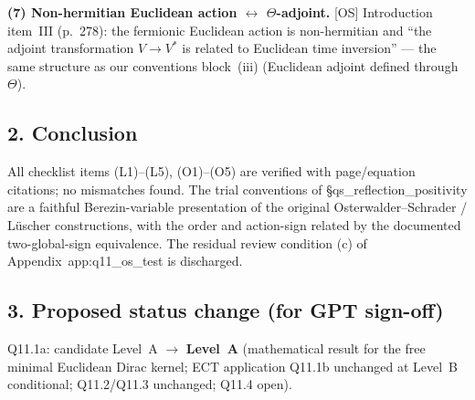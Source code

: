 \textbf{(7) Non-hermitian Euclidean action $\leftrightarrow$
$\Theta$-adjoint.}
[OS] Introduction item~III (p.~278): the fermionic Euclidean
action is non-hermitian and ``the adjoint transformation
$V\to V^*$ is related to Euclidean time inversion'' --- the same
structure as our conventions block~(iii) (Euclidean adjoint defined
through $\Theta$).

\subsection*{2. Conclusion}
All checklist items (L1)--(L5), (O1)--(O5) are verified with
page/equation citations; no mismatches found.
The trial conventions of \S qs\_reflection\_positivity are a
faithful Berezin-variable presentation of the original
Osterwalder--Schrader / L\"uscher constructions, with the order
and action-sign related by the documented two-global-sign
equivalence.
The residual review condition (c) of Appendix~app:q11\_os\_test is
discharged.

\subsection*{3. Proposed status change (for GPT sign-off)}
Q11.1a: candidate Level~A $\to$ \textbf{Level~A} (mathematical
result for the free minimal Euclidean Dirac kernel; ECT application
Q11.1b unchanged at Level~B conditional; Q11.2/Q11.3 unchanged;
Q11.4 open).

